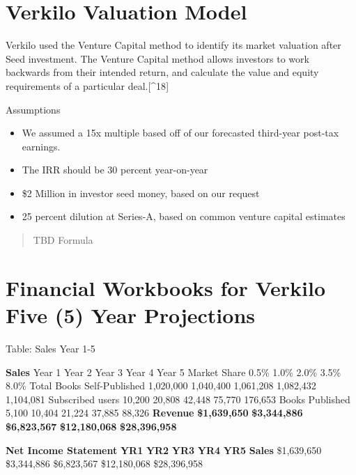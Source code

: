 \documentclass[10pt,openany]{book}
\makeatletter
\newcommand*{\pen@ltyabovepfbreak}{2}
\newcommand*{\pen@ltybelowpfbreak}{-4}
\newlength{\pfbreakskip}
\newcommand{\pfbreak}{\@ifstar{\@spfbreakgap}{\@pfbreakgap}}
\newcommand{\@pfbreakgap}{%
  \par {%
  \skip@\lastskip
  \nobreak
  \vskip -\ifdim\prevdepth>\maxdepth \maxdepth
          \else\ifdim\prevdepth>-1000pt\prevdepth
            \else\ifinner 0pt
              \else \pagedepth
          \fi \fi \fi
  \vskip -\skip@
  \ifdim\skip@<\pfbreakskip
    \advance\skip@ -1\skip@ \advance\skip@ 1\pfbreakskip
  \fi
  \penalty\pen@ltyabovepfbreak
  \vskip\skip@
  \penalty\pen@ltybelowpfbreak
  }
  \@afterindentfalse
  \@afterheading
}
\newcommand{\@spfbreakgap}{%
  \par {%
  \skip@\lastskip
  \nobreak
  \vskip -\ifdim\prevdepth>\maxdepth \maxdepth
          \else\ifdim\prevdepth>-1000pt\prevdepth
            \else\ifinner 0pt
              \else \pagedepth
          \fi \fi \fi
  \vskip -\skip@
  \ifdim\skip@<\pfbreakskip
    \advance\skip@ -1\skip@ \advance\skip@ 1\pfbreakskip
  \fi
  \penalty\pen@ltyabovepfbreak
  \vskip\skip@
  \penalty\pen@ltybelowpfbreak
  }
  \@afterindenttrue
  \@afterheading
}
\makeatother
\begin{document}
\hypertarget{verkilo-valuation-model}{%
\section{Verkilo Valuation Model}\label{verkilo-valuation-model}}

Verkilo used the Venture Capital method to identify its market valuation
after Seed investment. The Venture Capital method allows investors to
work backwards from their intended return, and calculate the value and
equity requirements of a particular deal.{[}\^{}18{]}

Assumptions

\begin{itemize}
\item
  We assumed a 15x multiple based off of our forecasted third-year
  post-tax earnings.
\item
  The IRR should be 30 percent year-on-year
\item
  \$2 Million in investor seed money, based on our request
\item
  25 percent dilution at Series-A, based on common venture capital
  estimates
\end{itemize}

\begin{quote}
TBD Formula
\end{quote}

\hypertarget{financial-workbooks-for-verkilo-five-5-year-projections}{%
\section{Financial Workbooks for Verkilo Five (5) Year
Projections}\label{financial-workbooks-for-verkilo-five-5-year-projections}}

Table: Sales Year 1-5

\pfbreak

\textbf{{Sales}} Year 1 Year 2 Year 3 Year 4 Year 5 Market Share 0.5\%
1.0\% 2.0\% 3.5\% 8.0\% Total Books Self-Published 1,020,000 1,040,400
1,061,208 1,082,432 1,104,081 Subscribed users 10,200 20,808 42,448
75,770 176,653 Books Published 5,100 10,404 21,224 37,885 88,326
\textbf{Revenue} \textbf{\$1,639,650} \textbf{\$3,344,886}
\textbf{\$6,823,567} \textbf{\$12,180,068} \textbf{\$28,396,958}

\textbf{{Net Income Statement}} \textbf{YR1} \textbf{YR2} \textbf{YR3}
\textbf{YR4} \textbf{YR5} \textbf{Sales} \$1,639,650 \$3,344,886
\$6,823,567 \$12,180,068 \$28,396,958
\end{document}
